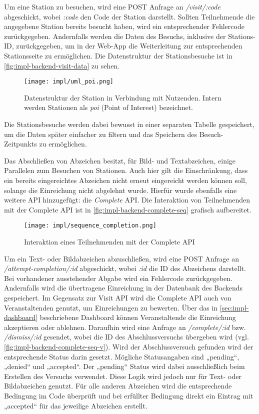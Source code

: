 Um eine Station zu besuchen, wird eine POST Anfrage an \textit{/visit/:code}
abgeschickt, wobei \textit{:code} den Code der Station darstellt. Sollten
Teilnehmende die angegebene Station bereits besucht haben, wird ein
entsprechender Fehlercode zurückgegeben. Andernfalls werden die Daten des
Besuchs, inklusive der Stations-ID, zurückgegeben, um in der Web-App die
Weiterleitung zur entsprechenden Stationsseite zu ermöglichen. Die Datenstruktur
der Stationsbesuche ist in \autoref{fig:impl-backend-visit-data} zu sehen.

\begin{figure}[htpb]
    \centering
    \texttt{[image: impl/uml\_poi.png]}
    \caption{Datenstruktur der Station in Verbindung mit Nutzenden. Intern werden Stationen als \textit{poi} (Point of Interest)
        bezeichnet.}
    \label{fig:impl-backend-visit-data}
\end{figure}

Die Stationsbesuche werden dabei bewusst in einer separaten Tabelle gespeichert,
um die Daten später einfacher zu filtern und das Speichern des Besuch-Zeitpunkts
zu ermöglichen.

Das Abschließen von Abzeichen besitzt, für Bild- und Textabzeichen, einige
Parallelen zum Besuchen von Stationen. Auch hier gilt die Einschränkung, dass
ein bereits eingereichtes Abzeichen nicht erneut eingereicht werden können soll,
solange die Einreichung nicht abgelehnt wurde. Hierfür wurde ebenfalls eine
weitere API hinzugefügt: die \textit{Complete} API. Die Interaktion von
Teilnehmenden mit der Complete API ist in
\autoref{fig:impl-backend-complete-seq} grafisch aufbereitet.

\begin{figure}[ht]
    \centering
    \texttt{[image: impl/sequence\_completion.png]}
    \caption{Interaktion eines Teilnehmenden mit der Complete API}
    \label{fig:impl-backend-complete-seq}
\end{figure}

Um ein Text- oder Bildabzeichen abzuschließen, wird eine POST Anfrage an
\textit{/attempt-completion/:id} abgeschickt, wobei \textit{:id} die ID des
Abzeichens darstellt. Bei vorhandener ausstehender Abgabe wird ein Fehlercode
zurückgegeben. Andernfalls wird die übertragene Einreichung in der Datenbank des
Backends gespeichert. Im Gegensatz zur Visit API wird die Complete API auch von
Veranstaltenden genutzt, um Einreichungen zu bewerten. Über das in
\autoref{sec:impl-dashboard} beschriebene Dashboard können Veranstaltende die
Einreichung akzeptieren oder ablehnen. Daraufhin wird eine Anfrage an
\textit{/complete/:id} bzw. \textit{/dismiss/:id} gesendet, wobei die ID des
Abschlussversuchs übergeben wird (vgl.
\autoref{fig:impl-backend-complete-seq-v}). Wird der Abschlussversuch gefunden
wird der entsprechende Status darin gesetzt. Mögliche Statusangaben sind
„pending“, „denied“ und „accepted“. Der „pending“ Status wird dabei
ausschließlich beim Erstellen des Versuchs verwendet. Diese Logik wird jedoch
nur für Text- oder Bildabzeichen genutzt. Für alle anderen Abzeichen wird die
entsprechende Bedingung im Code überprüft und bei erfüllter Bedingung direkt
ein Eintrag mit „accepted“ für das jeweilige Abzeichen erstellt.

